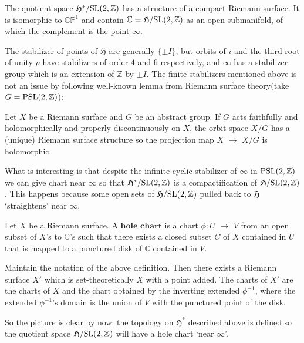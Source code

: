 \documentclass[a4paper,11pt]{article}
\begin{document}
\begin{thm}
The quotient space $\mathfrak{H}^*/\textnormal{SL}(2,\mathbb{Z})$ has a structure of a compact Riemann surface.
It is isomorphic to $\mathbb{CP}^1$ and contain $\mathbb{C}=\mathfrak{H}/\textnormal{SL}(2,\mathbb{Z})$ as an open submanifold, of which the complement is the point $\infty$.
\end{thm}

The stabilizer of points of $\mathfrak{H}$ are generally $\{\pm$$I\}$, but orbits of $i$ and the third root of unity $\rho$ have stabilizers of order $4$ and $6$ respectively, and $\infty$ has a stabilizer group which is an extension of $\mathbb{Z}$ by $\pm$$I$.
The finite stabilizers mentioned above is not an issue by following well-known lemma from Riemann surface theory(take $G=\textnormal{PSL}(2,\mathbb{Z})$):
\begin{lem}
Let $X$ be a Riemann surface and $G$ be an abstract group.
If $G$ acts faithfully and holomorphically and properly discontinuously on $X$, the orbit space $X/G$ has a (unique) Riemann surface structure so the projection map $X$ $\to$ $X/G$ is holomorphic.
\end{lem}

What is interesting is that despite the infinite cyclic stabilizer of $\infty$ in $\textnormal{PSL}(2,\mathbb{Z})$ we can give chart near $\infty$ so that $\mathfrak{H}^*/\textnormal{SL}(2,\mathbb{Z})$ is a compactification of $\mathfrak{H}/\textnormal{SL}(2,\mathbb{Z})$.
This happens because some open sets of $\mathfrak{H}/\textnormal{SL}(2,\mathbb{Z})$ pulled back to $\mathfrak{H}$ `straightens' near $\infty$.

\begin{defn}
Let $X$ be a Riemann surface.
A $\textbf{hole chart}$ is a chart $\phi:U$ $\to$ $V$ from an open subset of $X$'s to $\mathbb{C}$'s such that there exists a closed subset $C$ of $X$ contained in $U$ that is mapped to a punctured disk of $\mathbb{C}$ contained in $V$.
\end{defn}

\begin{lem}
Maintain the notation of the above definition.
Then there exists a Riemann surface $X'$ which is set-theoretically $X$ with a point added.
The charts of $X'$ are the charts of $X$ and the chart obtained by the inverting extended $\phi^{-1}$, where the extended $\phi^{-1}$'s domain is the union of $V$ with the punctured point of the disk.
\end{lem}

So the picture is clear by now: the topology on $\mathfrak{H}^*$ described above is defined so the quotient space $\mathfrak{H}/\textnormal{SL}(2,\mathbb{Z})$ will have a hole chart `near $\infty$'.\\
\end{document}
